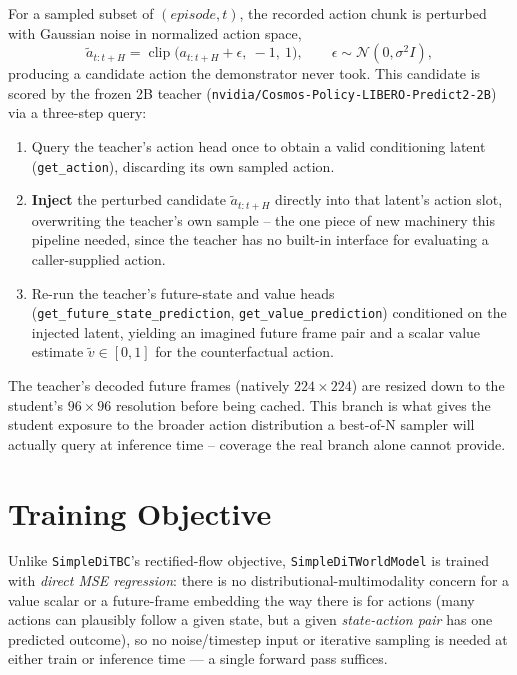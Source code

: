 \documentclass[11pt]{article}
\begin{document}
For a sampled subset of $(episode, t)$, the recorded action chunk is perturbed with Gaussian noise
in normalized action space,
\begin{equation}
    \tilde{a}_{t:t+H} = \operatorname{clip}\!\big(a_{t:t+H} + \epsilon,\ -1,\ 1\big), \qquad
    \epsilon \sim \mathcal{N}(0, \sigma^2 I),
\end{equation}
producing a candidate action the demonstrator never took. This candidate is scored by the frozen
2B teacher (\texttt{nvidia/Cosmos-Policy-LIBERO-Predict2-2B}) via a three-step query:
\begin{enumerate}[nosep]
    \item Query the teacher's action head once to obtain a valid conditioning latent
    (\texttt{get\_action}), discarding its own sampled action.
    \item \textbf{Inject} the perturbed candidate $\tilde{a}_{t:t+H}$ directly into that latent's
    action slot, overwriting the teacher's own sample -- the one piece of new machinery this
    pipeline needed, since the teacher has no built-in interface for evaluating a
    caller-supplied action.
    \item Re-run the teacher's future-state and value heads
    (\texttt{get\_future\_state\_prediction}, \texttt{get\_value\_prediction}) conditioned on the
    injected latent, yielding an imagined future frame pair and a scalar value estimate
    $\tilde{v} \in [0,1]$ for the counterfactual action.
\end{enumerate}
The teacher's decoded future frames (natively $224\times224$) are resized down to the student's
$96\times96$ resolution before being cached. This branch is what gives the student exposure to the
broader action distribution a best-of-N sampler will actually query at inference time -- coverage
the real branch alone cannot provide.

\section{Training Objective}

Unlike \texttt{SimpleDiTBC}'s rectified-flow objective, \texttt{SimpleDiTWorldModel} is trained
with \emph{direct MSE regression}: there is no distributional-multimodality concern for a value
scalar or a future-frame embedding the way there is for actions (many actions can plausibly follow
a given state, but a given \emph{state-action pair} has one predicted outcome), so no
noise/timestep input or iterative sampling is needed at either train or inference time --- a single
forward pass suffices.
\end{document}
